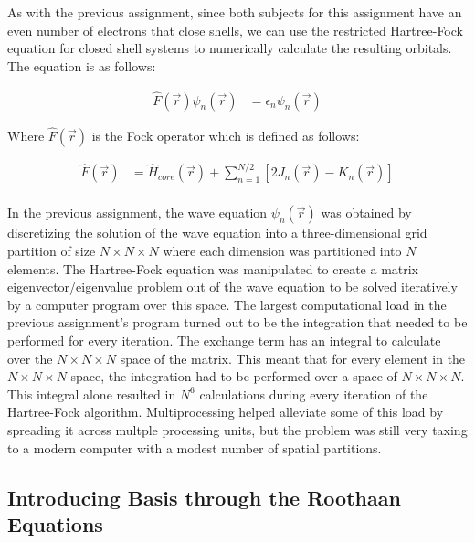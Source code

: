 \documentclass[10pt, oneside, letterpaper]{article}
\begin{document}
As with the previous assignment, since both subjects for this assignment have an even number of electrons that close shells, we can use the restricted Hartree-Fock equation for closed shell systems to numerically calculate the resulting orbitals. The equation is as follows:

\begin{align*}
  \hat{F}(\vec{r})\psi_n(\vec{r}) &= \epsilon_n\psi_n(\vec{r})
\end{align*}

Where $\hat{F}(\vec{r})$ is the Fock operator which is defined as follows:

\begin{align*}
  \hat{F}(\vec{r}) &= \hat{H}_{core}(\vec{r}) + \sum_{n=1}^{N/2}\left[2J_n(\vec{r}) - K_n(\vec{r})\right]\\
\end{align*}

In the previous assignment, the wave equation $\psi_n(\vec{r})$ was obtained by discretizing the solution of the wave equation into a three-dimensional grid partition of size $N \times N \times N$ where each dimension was partitioned into $N$ elements. The Hartree-Fock equation was manipulated to create a matrix eigenvector/eigenvalue problem out of the wave equation to be solved iteratively by a computer program over this space. The largest computational load in the previous assignment's program turned out to be the integration that needed to be performed for every iteration. The exchange term has an integral to calculate over the $N \times N \times N$ space of the matrix. This meant that for every element in the $N \times N \times N$ space, the integration had to be performed over a space of $N \times N \times N$. This integral alone resulted in $N^6$ calculations during every iteration of the Hartree-Fock algorithm. Multiprocessing helped alleviate some of this load by spreading it across multple processing units, but the problem was still very taxing to a modern computer with a modest number of spatial partitions.

\subsection{Introducing Basis through the Roothaan Equations}
\end{document}
